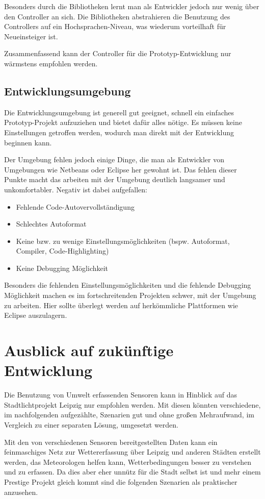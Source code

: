 			Besonders durch die Bibliotheken lernt man als Entwickler jedoch nur wenig über den Controller an sich. Die Bibliotheken abstrahieren die Benutzung des Controllers auf ein Hochsprachen-Niveau, was wiederum vorteilhaft für Neueinsteiger ist.
			
			Zusammenfassend kann der Controller für die Prototyp-Entwicklung nur wärmstens empfohlen werden.
			\newpage
		\subsection{Entwicklungsumgebung}
			Die Entwicklungsumgebung ist generell gut geeignet, schnell ein einfaches Prototyp-Projekt aufzuziehen und bietet dafür alles nötige. Es müssen keine Einstellungen getroffen werden, wodurch man direkt mit der Entwicklung beginnen kann.
			
			Der Umgebung fehlen jedoch einige Dinge, die man als Entwickler von Umgebungen wie Netbeans oder Eclipse her gewohnt ist. Das fehlen dieser Punkte macht das arbeiten mit der Umgebung deutlich langsamer und unkomfortabler. Negativ ist dabei aufgefallen:
			
			\begin{itemize}
				\item Fehlende Code-Autovervollständigung
				\item Schlechtes Autoformat
				\item Keine bzw. zu wenige Einstellungsmöglichkeiten (bspw. Autoformat, Compiler, Code-Highlighting)
				\item Keine Debugging Möglichkeit
			\end{itemize}
			
			Besonders die fehlenden Einstellungsmöglichkeiten und die fehlende Debugging Möglichkeit machen es im fortschreitenden Projekten schwer, mit der Umgebung zu arbeiten. Hier sollte überlegt werden auf herkömmliche Plattformen wie Eclipse auszulagern.
	\section{Ausblick auf zukünftige Entwicklung}
		Die Benutzung von Umwelt erfassenden Sensoren kann in Hinblick auf das Stadtlichtprojekt Leipzig nur empfohlen werden. Mit diesen könnten verschiedene, im nachfolgenden aufgezählte, Szenarien gut und ohne großen Mehraufwand, im Vergleich zu einer separaten Lösung, umgesetzt werden.
		
		Mit den von verschiedenen Sensoren bereitgestellten Daten kann ein feinmaschiges Netz zur Wettererfassung über Leipzig und anderen Städten erstellt werden, das Meteorologen helfen kann, Wetterbedingungen besser zu verstehen und zu erfassen. Da dies aber eher unnütz für die Stadt selbst ist und mehr einem Prestige Projekt gleich kommt sind die folgenden Szenarien als praktischer anzusehen.
		
